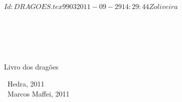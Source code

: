 \documentclass[a5,11pt]{hedrabook}
\begin{document}
\SVN $Id: DRAGOES.tex 9903 2011-09-29 14:29:44Z oliveira $

\ \\
\ \\
\ \\
\ \\
{\centering\LARGE\thispagestyle{empty}
Livro dos dragões
\par}

\pagebreak

\newcommand{\hedracopy}{\raisebox{-1.2mm}{$^\copyright$}}

\noindent\hedracopy\ Hedra, 2011\\
\noindent\hedracopy\ Marcos Maffei, 2011
\bigskip

\end{document}
